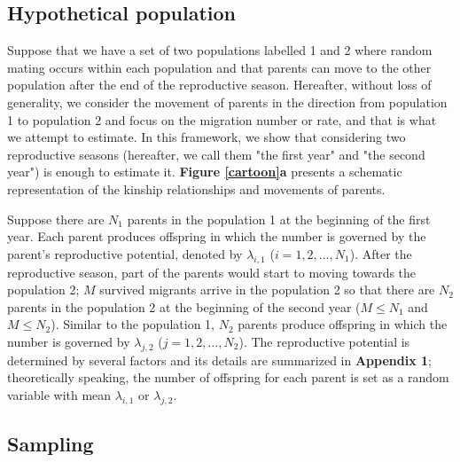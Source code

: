 \documentclass[12pt, English]{article}
\begin{document}
\begin{spacing}{1.9}
\subsection{Hypothetical population}

Suppose that we have a set of two populations labelled 1 and 2 where random mating occurs within each population and that parents can move to the other population after the end of the reproductive season. Hereafter, without loss of generality, we consider the movement of parents in the direction from population 1 to population 2 and focus on the migration number or rate, and that is what we attempt to estimate. In this framework, we show that considering two reproductive seasons (hereafter, we call them "the first year" and "the second year") is enough to estimate it. {\bf Figure \ref{cartoon}a} presents a schematic representation of the kinship relationships and movements of parents. 

Suppose there are $N_1$ parents in the population 1 at the beginning of the first year. Each parent produces offspring in which the number is governed by the parent's reproductive potential, denoted by $\lambda_{i,1}$ ($i=1,2,\ldots,N_1$). After the reproductive season, part of the parents would start to moving towards the population 2; $M$ survived migrants arrive in the population 2 so that there are $N_2$ parents in the population 2 at the beginning of the second year ($M \le N_1$ and $M \le N_2$). Similar to the population 1, $N_2$ parents produce offspring in which the number is governed by $\lambda_{j,2}$ ($j=1,2,\ldots,N_2$). The reproductive potential is determined by several factors and its details are summarized in {\bf Appendix 1}; theoretically speaking, the number of offspring for each parent is set as a random variable with mean $\lambda_{i,1}$ or $\lambda_{j,2}$. 

\begin{center}
\end{center}

\subsection{Sampling}


\end{spacing}
\end{document}
